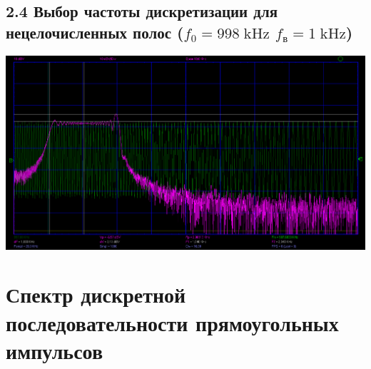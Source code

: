 \documentclass[12pt,a4paper]{article}
\begin{document}
\newpage


\subsection*{2.4 Выбор частоты дискретизации для нецелочисленных полос ($f_{\text{0}} = 998 \;\text{kHz}$  $f_{\text{в}} = 1 \;\text{kHz}$)}
\vspace*{20pt}
\begin{center}
	\includegraphics[width=1\linewidth]{data/2-4_rect_997KHZ-999KHZ_20KHZ}\hfill
\end{center}	

\newpage


\section*{Спектр дискретной последовательности прямоугольных импульсов}
\vspace*{20pt}
\end{document}
